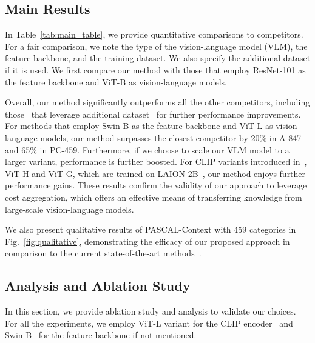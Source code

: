 \documentclass[10pt,twocolumn,letterpaper]{article}
\begin{document}
\subsection{Main Results}

In Table~\ref{tab:main_table}, we provide quantitative comparisons to competitors. For a fair comparison, we note the type of the vision-language model (VLM), the feature backbone, and the training dataset. We also specify the additional dataset if it is used. We first compare our method with those that employ ResNet-101 as the feature backbone and ViT-B as vision-language models. 

Overall, our method significantly outperforms all the other competitors, including  those~\cite{ghiasi2022scaling,liang2022open} that leverage additional dataset~\cite{chen2015microsoft,pont2020connecting} for further performance improvements. For methods that employ Swin-B as the feature backbone and ViT-L as vision-language models, our method surpasses the closest competitor by 20\% in A-847 and 65\% in PC-459.
Furthermore, if we choose to scale our VLM model to a larger variant, performance is further boosted. For CLIP variants introduced in~\cite{cherti2022reproducible}, \ie ViT-H and ViT-G, which are trained on LAION-2B~\cite{schuhmann2022laion}, our method enjoys further performance gains. These results confirm the validity of our approach to leverage cost aggregation, which offers an effective means of transferring knowledge from large-scale vision-language models.

We also present qualitative results of PASCAL-Context with 459 categories in Fig.~\ref{fig:qualitative}, demonstrating the efficacy of our proposed approach in comparison to the current state-of-the-art methods~\cite{ding2022decoupling, xu2022simple,liang2022open}. 

\subsection{Analysis and Ablation Study}
In this section, we provide ablation study and analysis to validate our choices. For all the experiments, we employ ViT-L variant for the CLIP encoder~\cite{radford2021learning} and Swin-B~\cite{liu2021swin} for the feature backbone if not mentioned.

\vspace{-10pt}
\end{document}
